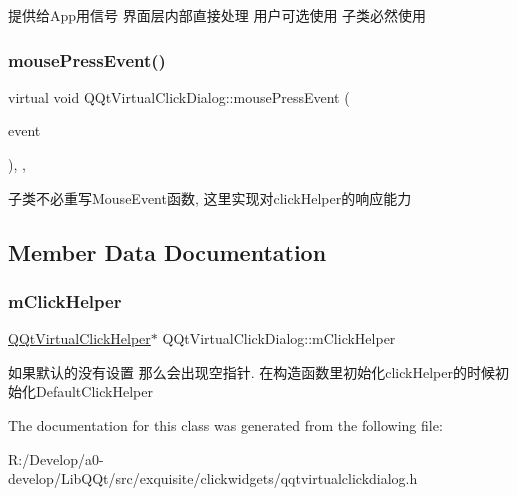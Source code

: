 提供给\+App用信号 界面层内部直接处理 用户可选使用 子类必然使用 \mbox{\label{class_q_qt_virtual_click_dialog_a8e8f31f3a7c00970f5b2feb60073eb83}} 
\subsubsection{\texorpdfstring{mouse\+Press\+Event()}{mousePressEvent()}}
{\footnotesize\ttfamily virtual void Q\+Qt\+Virtual\+Click\+Dialog\+::mouse\+Press\+Event (\begin{DoxyParamCaption}\item[{Q\+Mouse\+Event $\ast$}]{event }\end{DoxyParamCaption})\hspace{0.3cm}{\ttfamily [inline]}, {\ttfamily [protected]}, {\ttfamily [virtual]}}

子类不必重写\+Mouse\+Event函数, 这里实现对click\+Helper的响应能力 

\subsection{Member Data Documentation}
\mbox{\label{class_q_qt_virtual_click_dialog_afdf66e13b821224b34c0a4b68c5c0564}} 
\subsubsection{\texorpdfstring{m\+Click\+Helper}{mClickHelper}}
{\footnotesize\ttfamily \mbox{\hyperlink{class_q_qt_virtual_click_helper}{Q\+Qt\+Virtual\+Click\+Helper}}$\ast$ Q\+Qt\+Virtual\+Click\+Dialog\+::m\+Click\+Helper\hspace{0.3cm}{\ttfamily [protected]}}

如果默认的没有设置 那么会出现空指针. 在构造函数里初始化click\+Helper的时候初始化\+Default\+Click\+Helper 

The documentation for this class was generated from the following file\+:\begin{DoxyCompactItemize}
\item 
R\+:/\+Develop/a0-\/develop/\+Lib\+Q\+Qt/src/exquisite/clickwidgets/qqtvirtualclickdialog.\+h\end{DoxyCompactItemize}
